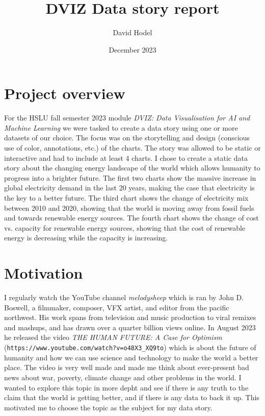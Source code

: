 \documentclass{article}
\title{DVIZ Data story report}
\author{David Hodel}
\date{December 2023}
\begin{document}
\maketitle
\newpage

\tableofcontents
\newpage

\section{Project overview}

For the HSLU fall semester 2023 module \textit{DVIZ: Data Visualisation for AI and Machine Learning} we were tasked to create a data story
using one or more datasets of our choice. The focus was on the storytelling and design (conscious use of color, annotations, etc.) of the charts.
The story was allowed to be static or interactive and had to include at least 4 charts. \newline
I chose to create a static data story about the changing energy landscape of the world which allows humanity to progress into a brighter future.
The first two charts show the massive increase in global electricity demand in the last 20 years, making the case that electricity is the key to a better future.
The third chart shows the change of electricity mix between 2010 and 2020, showing that the world is moving away from fossil fuels and towards renewable energy sources.
The fourth chart shows the change of cost vs. capacity for renewable energy sources, showing that the cost of renewable energy is decreasing while the capacity is increasing. \newline

\newpage

\section{Motivation}

I regularly watch the YouTube channel \textit{melodysheep} which is ran by John D. Boswell, a filmmaker, composer, VFX artist, and editor from the pacific northwest. 
His work spans from television and music production to viral remixes and mashups,
and has drawn over a quarter billion views online. \newline
In August 2023 he released the video \textit{THE HUMAN FUTURE: A Case for Optimism} (\texttt{https://www.youtube.com/watch?v=o48X3\_XQ9to})
which is about the future of humanity and how we can use science and technology to make the world a better place.
The video is very well made and made me think about ever-present bad news about war, poverty, climate change and other problems in the world. \newline
I wanted to explore this topic in more depht and see if there is any truth to the claim that the world is getting better, and if there is any data to back it up.
This motivated me to choose the topic as the subject for my data story.
\end{document}
